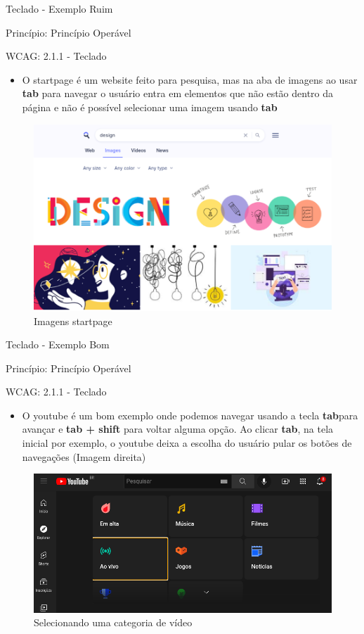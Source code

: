 \documentclass{beamer}
\begin{document}
\begin{frame}{Teclado - Exemplo Ruim}

Princípio: Princípio Operável

WCAG: 2.1.1 - Teclado

\begin{itemize}
	\item O startpage é um website feito para pesquisa, mas na aba de imagens ao usar \textbf{tab} para navegar o usuário entra em elementos que não estão dentro da página e não é possível selecionar uma imagem usando \textbf{tab}
\end{itemize}
\begin{figure}
    \centering
    \includegraphics[scale=0.2]{images/no_keyboard.png}
    \caption{Imagens startpage}
\end{figure}

\end{frame}
\begin{frame}{Teclado - Exemplo Bom}

Princípio: Princípio Operável

WCAG: 2.1.1 - Teclado

\begin{itemize}
	\item O youtube é um bom exemplo onde podemos navegar usando a tecla \textbf{tab}para avançar  e \textbf{tab + shift} para voltar alguma opção. Ao clicar \textbf{tab}, na tela inicial por exemplo, o youtube deixa a escolha do usuário pular os botões de navegações (Imagem direita)
\end{itemize}
\begin{figure}
    \centering
    \includegraphics[scale=0.2]{images/keyboard.png}
    \caption{Selecionando uma categoria de vídeo}
\end{figure}

\end{frame}
\end{document}
